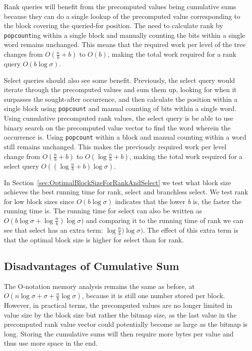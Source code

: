 Rank queries will benefit from the precomputed values being cumulative sums because they can do a single lookup of the precomputed value corresponding to the block covering the queried-for position.
The need to calculate rank by \texttt{popcount}ing within a single block and manually counting the bits within a single word remains unchanged.
This means that the required work per level of the tree changes from $O(\frac{n}{b}+b)$ to $O(b)$, making the total work required for a rank query $O(b \log \sigma)$.

Select queries should also see some benefit.
Previously, the select query would iterate through the precomputed values and sum them up, looking for when it surpasses the sought-after occurrence, and then calculate the position within a single block using \texttt{popcount} and manual counting of bits within a single word.
Using cumulative precomputed rank values, the select query is be able to use binary search on the precomputed value vector to find the word wherein the occurrence is.
Using \texttt{popcount} within a block and manual counting within a word still remains unchanged.
This makes the previously required work per level change from $O(\frac{n}{b} + b)$ to $O(\log \frac{n}{b} + b)$, making the total work required for a select query $O((\log \frac{n}{b} + b) \log \sigma)$.

In Section~\ref{sec:OptimalBlockSizeForRankAndSelect} we test what block size achieves the best running time for rank, select and branchless select.
We test rank for low block sizes since $O(b \log \sigma)$ indicates that the lower \textit{b} is, the faster the running time is.
The running time for select can also be written as $O(b \log \sigma + \log \frac{n}{b}) \log \sigma)$ and comparing it to the running time of rank we can see that select has an extra term: $\log \frac{n}{b}) \log \sigma)$.
The effect of this extra term is that the optimal block size is higher for select than for rank.

\subsection{Disadvantages of Cumulative Sum}
The O-notation memory analysis remains the same as before, at $O(n \log \sigma + \sigma + \frac{n}{b} \log \sigma)$, because it is still one number stored per block.
However, in practical terms, the precomputed values are no longer limited in value size by the block size but rather the bitmap size, as the last value in the precomputed rank value vector could potentially become as large as the bitmap is long.
Storing the cumulative sums will then require more bytes per value and thus use more space in the end.

